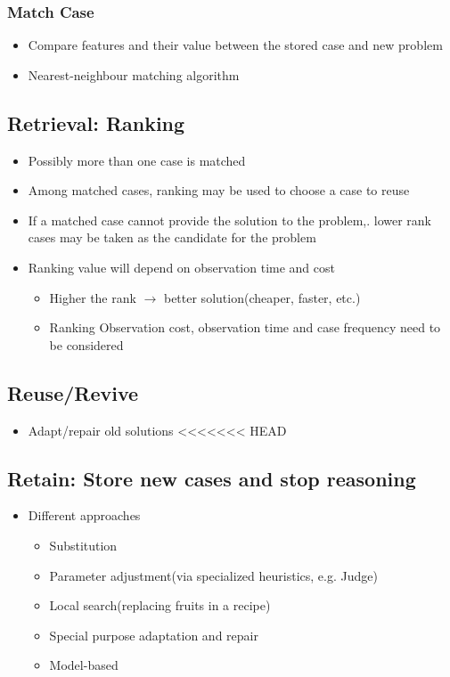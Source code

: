 \subsubsection{Match Case}
\begin{itemize}
\item Compare features and their value between the stored case and new problem
\item Nearest-neighbour matching algorithm
\end{itemize}

\subsection{Retrieval: Ranking}
\begin{itemize}
\item Possibly more than one case is matched
\item Among matched cases, ranking may be used to choose a case to reuse
\item If a matched case cannot provide the solution to the problem,. lower rank cases may be taken as the candidate for the problem
\item Ranking value will depend on observation time and cost
\begin{itemize}
\item Higher the rank $\longrightarrow$ better solution(cheaper, faster, etc.)
\item Ranking Observation cost, observation time and case frequency need to be considered
\end{itemize}
\end{itemize}

\subsection{Reuse/Revive}
\begin{itemize}
\item Adapt/repair old solutions
<<<<<<< HEAD
\end{itemize}

\subsection{Retain: Store new cases and stop reasoning}

\begin{itemize}
\item Different approaches
\begin{itemize}
\item Substitution
\item Parameter adjustment(via specialized heuristics, e.g. Judge)
\item Local search(replacing fruits in a recipe)
\item Special purpose adaptation and repair
\item Model-based
\end{itemize}
\end{itemize}

